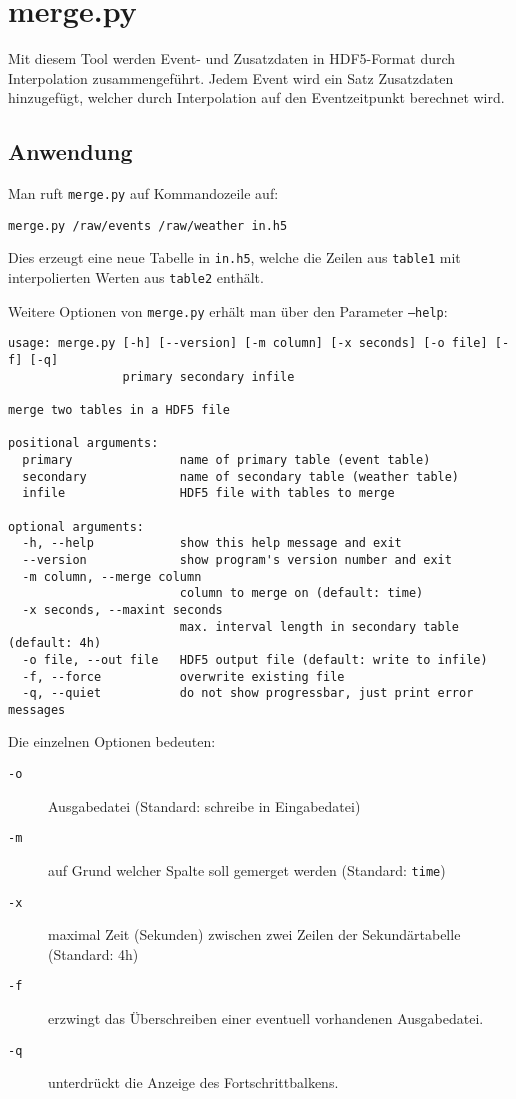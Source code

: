 \documentclass[version=last,
	a4paper,			%
	pagesize, 			%
	11pt,				%
	BCOR1cm,			%
	DIV12,	 			%
	pointlessnumbers,   %
	halfparskip,		%
]{scrreprt}
\begin{document}
\section{merge.py}
Mit diesem Tool werden Event- und Zusatzdaten in HDF5-Format durch Interpolation zusammengeführt. Jedem Event wird ein Satz Zusatzdaten hinzugefügt, welcher durch Interpolation auf den Eventzeitpunkt berechnet wird.

\subsection{Anwendung}
Man ruft \texttt{merge.py} auf Kommandozeile auf:
\begin{lstlisting}
merge.py /raw/events /raw/weather in.h5
\end{lstlisting}
Dies erzeugt eine neue Tabelle in \texttt{in.h5}, welche die Zeilen aus \texttt{table1} mit interpolierten Werten aus \texttt{table2} enthält.

Weitere Optionen von \texttt{merge.py} erhält man über den Parameter \texttt{--help}:
\begin{lstlisting}[caption={Kommandozeilen-Hilfe von rawdata.py}]
usage: merge.py [-h] [--version] [-m column] [-x seconds] [-o file] [-f] [-q]
                primary secondary infile

merge two tables in a HDF5 file

positional arguments:
  primary               name of primary table (event table)
  secondary             name of secondary table (weather table)
  infile                HDF5 file with tables to merge

optional arguments:
  -h, --help            show this help message and exit
  --version             show program's version number and exit
  -m column, --merge column
                        column to merge on (default: time)
  -x seconds, --maxint seconds
                        max. interval length in secondary table (default: 4h)
  -o file, --out file   HDF5 output file (default: write to infile)
  -f, --force           overwrite existing file
  -q, --quiet           do not show progressbar, just print error messages
\end{lstlisting}

Die einzelnen Optionen bedeuten:
\begin{description}
  \item[\verb"-o"] Ausgabedatei (Standard: schreibe in Eingabedatei)
  \item[\verb"-m"] auf Grund welcher Spalte soll gemerget werden (Standard: \texttt{time})
  \item[\verb"-x"] maximal Zeit (Sekunden) zwischen zwei Zeilen der Sekundärtabelle (Standard: 4h)
  \item[\verb"-f"] erzwingt das Überschreiben einer eventuell vorhandenen Ausgabedatei.
  \item[\verb"-q"] unterdrückt die Anzeige des Fortschrittbalkens.
\end{description}
\end{document}
